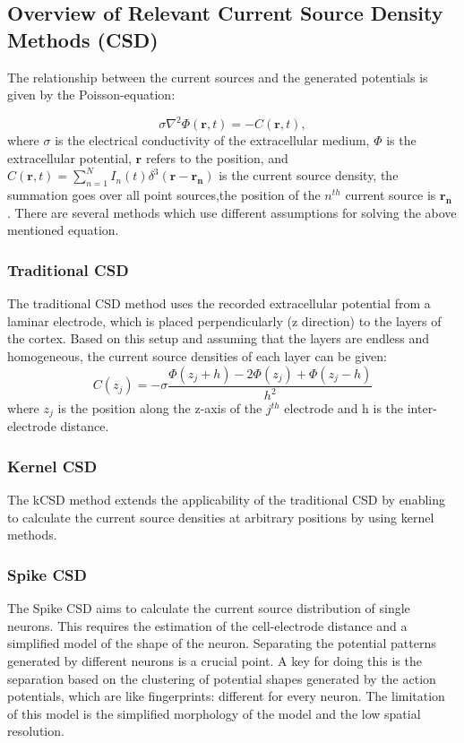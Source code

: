 \documentclass[12pt,a4paper]{article}
\begin{document}
\subsection{Overview of Relevant Current Source Density Methods (CSD)}
The relationship between the current sources and the generated potentials is given by the Poisson-equation:

\begin{equation}
 \sigma \nabla^2 \Phi(\mathbf{r},t )= -C(\mathbf{r},t),
\label{eq:poisson1}
\end{equation} 
where $\sigma$ is the electrical conductivity of the extracellular medium, $\Phi$ is the 
extracellular potential, $\mathbf{r}$ refers to the position, and 
$C(\mathbf{r},t)= \sum_{n=1}^N I_n (t) \delta^3(\mathbf{r}-\mathbf{r_n}) $
 is the current source density, the summation goes over all point sources,the position of the $n^{th}$ current source is $\mathbf{r_n}$ . There are several methods which use different assumptions for solving the above mentioned equation. 

\subsubsection{Traditional CSD}
The traditional CSD method \cite{Nicholson} uses the recorded extracellular potential from a laminar electrode, which is placed perpendicularly (z direction) to the layers of the cortex. Based on this setup and assuming that the layers are endless and homogeneous, the current source densities of each layer can be given:
\begin{equation}
C(z_j)= - \sigma \frac{\Phi(z_j+h)-2\Phi(z_j)+\Phi(z_j-h)}{h^2}
\end{equation}
 where $z_j$ is the position along the z-axis of the $j^{th}$ electrode and h is the inter-electrode distance.
\subsubsection{Kernel CSD}
The kCSD method \cite{DanielW} extends the applicability of the traditional CSD by enabling to calculate the current source densities at arbitrary positions by using kernel methods. 


  
\subsubsection{Spike CSD}
The Spike CSD \cite{Soma} aims to calculate the current source distribution of single neurons. This requires the estimation of the cell-electrode distance and a simplified model of the shape of the neuron. Separating the potential patterns generated by different neurons is a crucial point. A key for doing this is the separation based on the clustering of potential shapes generated by the action potentials, which are like fingerprints: different for every neuron. The limitation of this model is the simplified morphology of the model and the low spatial resolution.
\end{document}
